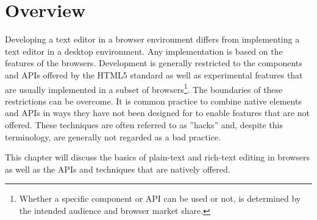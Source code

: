 
\section{Overview}

Developing a text editor in a browser environment differs from implementing a text editor in a desktop environment. Any implementation is based on the features of the browsers. Development is generally restricted to the components and APIs offered by the HTML5 standard as well as experimental features that are usually implemented in a subset of browsers\footnote{Whether a specific component or API can be used or not, is determined by the intended audience and browser market share.}. The boundaries of these restrictions can be overcome. It is common practice to combine native elements and APIs in ways they have not been designed for to enable features that are not offered. These techniques are often referred to as ''hacks'' and, despite this terminology, are generally not regarded as a bad practice.

This chapter will discuss the basics of plain-text and rich-text editing in browsers as well as the APIs and techniques that are natively offered.%




